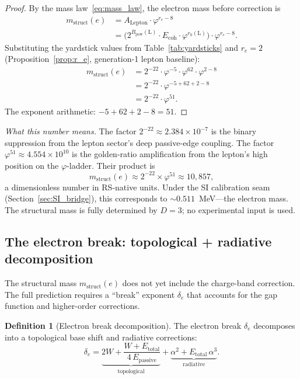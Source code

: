 \documentclass[11pt,a4paper]{article}
\theoremstyle{definition}
\newtheorem{definition}[theorem]{Definition}
\theoremstyle{remark}
\newcommand{\phig}{\varphi}
\newcommand{\Ecoh}{E_{\mathrm{coh}}}
\newcommand{\Epass}{E_{\mathrm{passive}}}
\newcommand{\Etot}{E_{\mathrm{total}}}
\begin{document}
\begin{proof}
By the mass law~\eqref{eq:mass_law}, the electron mass before correction is
\begin{align*}
  m_{\mathrm{struct}}(e)
  &= A_{\mathrm{Lepton}} \cdot \phig^{r_e - 8} \\
  &= \bigl(2^{B_{\mathrm{pow}}(\mathrm{L})} \cdot \Ecoh \cdot
     \phig^{r_0(\mathrm{L})}\bigr) \cdot \phig^{r_e - 8}.
\end{align*}
Substituting the yardstick values from
Table~\ref{tab:yardsticks} and $r_e = 2$
(Proposition~\ref{prop:r_e}, generation-1 lepton baseline):
\begin{align*}
  m_{\mathrm{struct}}(e)
  &= 2^{-22} \cdot \phig^{-5} \cdot \phig^{62} \cdot \phig^{2 - 8} \\
  &= 2^{-22} \cdot \phig^{-5 + 62 + 2 - 8} \\
  &= 2^{-22} \cdot \phig^{51}.
\end{align*}
The exponent arithmetic: $-5 + 62 + 2 - 8 = 51$.
\end{proof}

\noindent\textit{What this number means.}\quad
The factor $2^{-22} \approx 2.384 \times 10^{-7}$ is the binary suppression
from the lepton sector's deep passive-edge coupling.  The factor
$\phig^{51} \approx 4.554 \times 10^{10}$ is the golden-ratio amplification
from the lepton's high position on the $\phig$-ladder.  Their product is
\[
  m_{\mathrm{struct}}(e) \approx 2^{-22} \times \phig^{51}
  \approx 10{,}857,
\]
a dimensionless number in RS-native units.  Under the SI calibration
seam (Section~\ref{sec:SI_bridge}), this corresponds to $\sim 0.511$~MeV---the
electron mass.  The structural mass is fully determined by $D = 3$; no
experimental input is used.

\subsection{The electron break: topological + radiative decomposition}

The structural mass $m_{\mathrm{struct}}(e)$ does not yet include the
charge-band correction.  The full prediction requires a ``break'' exponent
$\delta_e$ that accounts for the gap function and higher-order corrections.

\begin{definition}[Electron break decomposition]
\label{def:delta_e}
The electron break $\delta_e$ decomposes into a topological base shift and
radiative corrections:
\begin{equation}
  \boxed{\delta_e =
    \underbrace{2W + \frac{W + \Etot}{4\,\Epass}}_{\text{topological}}
    + \underbrace{\alpha^2 + \Etot\,\alpha^3}_{\text{radiative}}.}
  \label{eq:delta_e_decomp}
\end{equation}
\end{definition}
\end{document}
